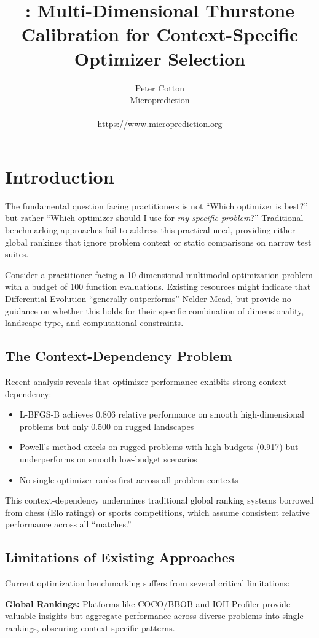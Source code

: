 \documentclass[article]{jss}
\author{
  Peter Cotton\\
  Microprediction\\
  \email{peter.cotton@gmail.com}\\
  \url{https://www.microprediction.org}
}
\title{\pkg{HumpDay}: Multi-Dimensional Thurstone Calibration for Context-Specific Optimizer Selection}
\begin{document}
\section{Introduction} \label{sec:intro}

The fundamental question facing practitioners is not ``Which optimizer is best?'' but rather ``Which optimizer should I use for \emph{my specific problem}?'' Traditional benchmarking approaches fail to address this practical need, providing either global rankings that ignore problem context or static comparisons on narrow test suites.

Consider a practitioner facing a 10-dimensional multimodal optimization problem with a budget of 100 function evaluations. Existing resources might indicate that Differential Evolution ``generally outperforms'' Nelder-Mead, but provide no guidance on whether this holds for their specific combination of dimensionality, landscape type, and computational constraints.

\subsection{The Context-Dependency Problem}

Recent analysis reveals that optimizer performance exhibits strong context dependency:
\begin{itemize}
\item L-BFGS-B achieves 0.806 relative performance on smooth high-dimensional problems but only 0.500 on rugged landscapes
\item Powell's method excels on rugged problems with high budgets (0.917) but underperforms on smooth low-budget scenarios
\item No single optimizer ranks first across all problem contexts
\end{itemize}

This context-dependency undermines traditional global ranking systems borrowed from chess (Elo ratings) or sports competitions, which assume consistent relative performance across all ``matches.''

\subsection{Limitations of Existing Approaches}

Current optimization benchmarking suffers from several critical limitations:

\textbf{Global Rankings:} Platforms like COCO/BBOB \citep{hansen2021coco} and IOH Profiler \citep{doerr2018ioh} provide valuable insights but aggregate performance across diverse problems into single rankings, obscuring context-specific patterns.
\end{document}
